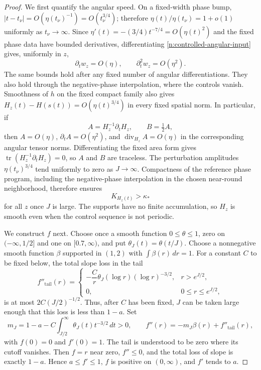 \begin{proof}
We first quantify the angular speed.  On a fixed-width phase bump,
$|t-t_\nu|=O(\eta(t_\nu)^{-1})=O(t_\nu^{3/4})$; therefore
$\eta(t)/\eta(t_\nu)=1+o(1)$ uniformly as $t_\nu\to\infty$.  Since
$\eta'(t)=-(3/4)t^{-7/4}=O(\eta(t)^2)$ and the fixed phase data have
bounded derivatives, differentiating \eqref{n:controlled-angular-input}
gives, uniformly in $z$,
\begin{equation}
 \partial_t w_z=O(\eta),\qquad
 \partial_t^2 w_z=O(\eta^2).
 \label{n:angular-parameter-derivatives}
\end{equation}
The same bounds hold after any fixed number of angular differentiations.
They also hold through the negative-phase interpolation, where the
controls vanish. Smoothness of $h$ on the fixed compact family also gives
$H_z(t)-H(s(t))=O(\eta(t)^{3/4})$ in every fixed spatial norm.  In particular, if
\[
 A=H_z^{-1}\partial_tH_z,\qquad B=\tfrac12 A,
\]
then $A=O(\eta)$, $\partial_tA=O(\eta^2)$, and
$\operatorname{div}_{H_z}A=O(\eta)$ in the corresponding angular tensor
norms.  Differentiating the fixed area form gives
$\operatorname{tr}(H_z^{-1}\partial_tH_z)=0$, so $A$ and $B$ are traceless.
The perturbation amplitudes $\eta(t_\nu)^{3/4}$ tend uniformly to zero as
$J\to\infty$.  Compactness of the reference phase program, including the negative-phase
interpolation in the chosen near-round neighborhood, therefore
ensures
\begin{equation}
 K_{H_z(t)}>\kappa_*
 \label{n:angular-curvature-lower}
\end{equation}
for all $z$ once $J$ is large.  The supports have no finite accumulation,
so $H_z$ is smooth even when the control sequence is not periodic.

We construct $f$ next.  Choose once a smooth function $0\le\theta\le1$, zero on
$(-\infty,1/2]$ and one on $[0.7,\infty)$, and put
$\theta_J(t)=\theta(t/J)$.  Choose a nonnegative smooth
function $\beta$ supported in $(1,2)$ with $\int\beta(r)\,dr=1$.  For a
constant $C$ to be fixed below, the total slope loss in the tail
\[
 f''_{\mathrm{tail}}(r)=
 \begin{cases}
 -\dfrac{C}{r}\theta_J(\log r)(\log r)^{-3/2},
     &r>e^{J/2},\\
 0, &0\le r\le e^{J/2},
 \end{cases}
\]
is at most $2C(J/2)^{-1/2}$.  Thus, after $C$ has been fixed, $J$ can be
taken large enough that this loss is less than $1-a$.  Set
\[
 m_J=1-a-C\int_{J/2}^{\infty}
                 \theta_J(t)t^{-3/2}\,dt>0,
 \qquad
 f''(r)=-m_J\beta(r)+f''_{\mathrm{tail}}(r),
\]
with $f(0)=0$ and $f'(0)=1$.  The tail is understood to be zero where its
cutoff vanishes.  Then $f=r$ near zero, $f''\le0$, and the total loss of
slope is exactly $1-a$.  Hence $a\le f'\le1$, $f$ is positive on
$(0,\infty)$, and $f'$ tends to $a$.


\end{proof}
